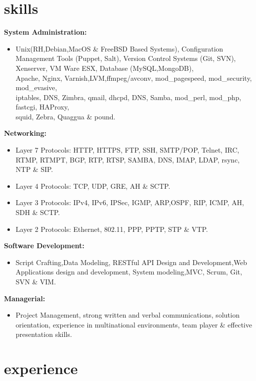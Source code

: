 \documentclass[]{friggeri-cv} %
\begin{document}
\section{skills}
{\large \textbf{System Administration:}}
\begin{itemize}
\item Unix(RH,Debian,MacOS \& FreeBSD Based Systems), Configuration Management Tools (Puppet, Salt), Version Control Systems (Git, SVN), Xenserver, VM Ware ESX, Database (MySQL,MongoDB),\\
Apache, Nginx, Varnish,LVM,ffmpeg/avconv, mod\_pagespeed, mod\_security, mod\_evasive,\\
iptables, DNS, Zimbra, qmail, dhcpd, DNS, Samba, mod\_perl, mod\_php, fastcgi, HAProxy, \\
squid, Zebra, Quaggua \& pound.  
\end{itemize}
{\large \textbf{Networking:}}
\begin{itemize}
\item Layer 7 Protocols: HTTP, HTTPS, FTP, SSH, SMTP/POP, Telnet, IRC, RTMP, RTMPT, BGP, RTP, RTSP, SAMBA, DNS, IMAP, LDAP, rsync, NTP \& SIP. 
\item Layer 4 Protocols: TCP, UDP, GRE, AH \& SCTP.
\item Layer 3 Protocols: IPv4, IPv6, IPSec, IGMP, ARP,OSPF, RIP, ICMP, AH, SDH \& SCTP.
\item Layer 2 Protocols: Ethernet, 802.11, PPP, PPTP, STP \& VTP.
\end{itemize}
{\large \textbf{Software Development:}}
\begin{itemize}
\item Script Crafting,Data Modeling, RESTful API Design and Development,Web Applications design and development, System modeling,MVC, Scrum, Git, SVN \& VIM.
\end{itemize}
{\large \textbf{Managerial:}}
\begin{itemize}
\item Project Management, strong written and verbal communications, solution orientation, experience in multinational environments, team player  \& effective presentation skills. 
\end{itemize}




\section{experience}
\end{document}
